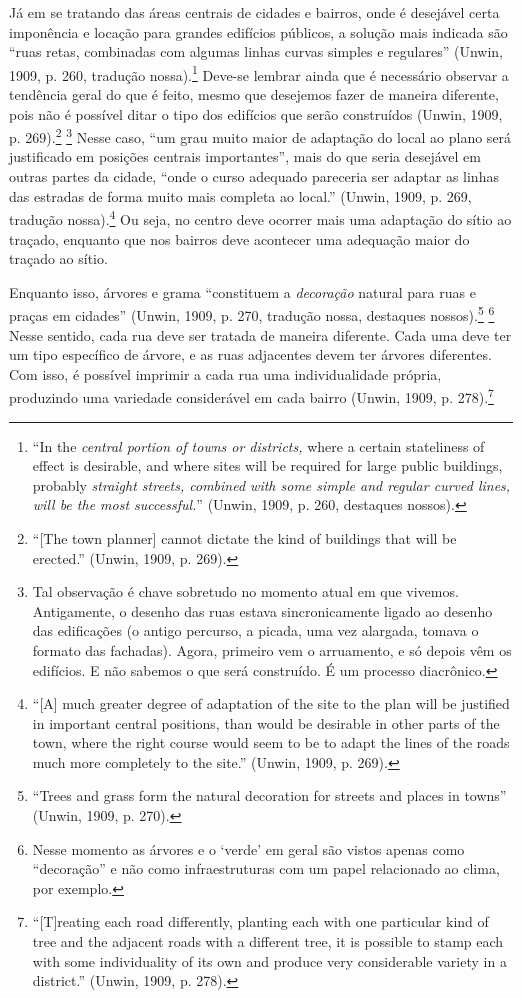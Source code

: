 \documentclass[12pt, a4paper]{book} %
\begin{document}
        Já em se tratando das áreas centrais de cidades e bairros, onde é desejável certa imponência e locação para grandes edifícios públicos, a solução mais indicada são ``ruas retas, combinadas com algumas linhas curvas simples e regulares'' (Unwin, 1909, p. 260, tradução nossa).\footnote[82]{``In the \textit{central portion of towns or districts,} where a certain stateliness of effect is desirable, and where sites will be required for large public buildings, probably \textit{straight streets, combined with some simple and regular curved lines, will be the most successful.}'' (Unwin, 1909, p. 260, destaques nossos).} Deve-se lembrar ainda que é necessário observar a tendência geral do que é feito, mesmo que desejemos fazer de maneira diferente, pois não é possível ditar o tipo dos edifícios que serão construídos (Unwin, 1909, p. 269).\footnote[83]{``[The town planner] cannot dictate the kind of buildings that will be erected.'' (Unwin, 1909, p. 269).} \footnote[84]{Tal observação é chave sobretudo no momento atual em que vivemos. Antigamente, o desenho das ruas estava sincronicamente ligado ao desenho das edificações (o antigo percurso, a picada, uma vez alargada, tomava o formato das fachadas). Agora, primeiro vem o arruamento, e só depois vêm os edifícios. E não sabemos o que será construído. É um processo diacrônico.} Nesse caso, ``um grau muito maior de adaptação do local ao plano será justificado em posições centrais importantes'', mais do que seria desejável em outras partes da cidade, ``onde o curso adequado pareceria ser adaptar as linhas das estradas de forma muito mais completa ao local.'' (Unwin, 1909, p. 269, tradução nossa).\footnote[85]{``[A] much greater degree of adaptation of the site to the plan will be justified in important central positions, than would be desirable in other parts of the town, where the right course would seem to be to adapt the lines of the roads much more completely to the site.'' (Unwin, 1909, p. 269).} Ou seja, no centro deve ocorrer mais uma adaptação do sítio ao traçado, enquanto que nos bairros deve acontecer uma adequação maior do traçado ao sítio.

        Enquanto isso, árvores e grama ``constituem a \textit{decoração} natural para ruas e praças em cidades'' (Unwin, 1909, p. 270, tradução nossa, destaques nossos).\footnote[86]{``Trees and grass form the natural decoration for streets and places in towns'' (Unwin, 1909, p. 270).} \footnote[87]{Nesse momento as árvores e o `verde' em geral são vistos apenas como ``decoração'' e não como infraestruturas com um papel relacionado ao clima, por exemplo.} Nesse sentido, cada rua deve ser tratada de maneira diferente. Cada uma deve ter um tipo específico de árvore, e as ruas adjacentes devem ter árvores diferentes. Com isso, é possível imprimir a cada rua uma individualidade própria, produzindo uma variedade considerável em cada bairro (Unwin, 1909, p. 278).\footnote[88]{``[T]reating each road differently, planting each with one particular kind of tree and the adjacent roads with a different tree, it is possible to stamp each with some individuality of its own and produce very considerable variety in a district.'' (Unwin, 1909, p. 278).}
\end{document}
